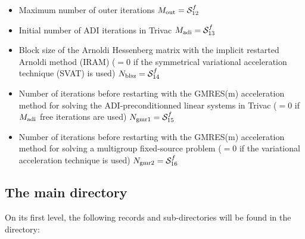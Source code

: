\begin{itemize}
\item Maximum number of outer iterations $M_{\rm out}=\mathcal{S}^{f}_{12}$

\item Initial number of ADI iterations in Trivac $M_{\rm adi}=\mathcal{S}^{f}_{13}$

\item Block size of the Arnoldi Hessenberg matrix with the implicit restarted Arnoldi method (IRAM) ($=0$ if the symmetrical variational acceleration technique (SVAT) is used) $N_{\rm blsz}=\mathcal{S}^{f}_{14}$

\item Number of iterations before restarting with the GMRES(m) acceleration method for solving the ADI-preconditionned linear systems in Trivac ($=0$ if $M_{\rm adi}$ free iterations are used) $N_{\rm gmr1}=\mathcal{S}^{f}_{15}$

\item Number of iterations before restarting with the GMRES(m) acceleration method for solving a multigroup fixed-source problem ($=0$ if the variational acceleration technique is used) $N_{\rm gmr2}=\mathcal{S}^{f}_{16}$

\end{itemize}

\subsection{The main  directory}\label{sect:fluxunkdirmain}

On its first level, the
following records and sub-directories will be found in the  directory:

